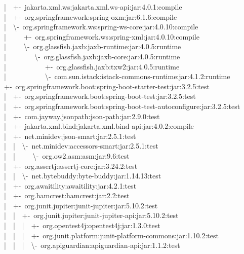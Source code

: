 \documentclass[
    paper=a4,
    twoside=false,
    parskip=half,
    listof=entryprefix,
    listof=totoc,
    index=totoc,
    bibliography=totoc,
    headsepline,
]{scrbook}
\begin{document}
    |~~+-~jakarta.xml.ws:jakarta.xml.ws-api:jar:4.0.1:compile\\
    |~~+-~org.springframework:spring-oxm:jar:6.1.6:compile\\
    |~~\textbackslash-~org.springframework.ws:spring-ws-core:jar:4.0.10:compile\\
    |~~~~~+-~org.springframework.ws:spring-xml:jar:4.0.10:compile\\
    |~~~~~\textbackslash-~org.glassfish.jaxb:jaxb-runtime:jar:4.0.5:runtime\\
    |~~~~~~~~\textbackslash-~org.glassfish.jaxb:jaxb-core:jar:4.0.5:runtime\\
    |~~~~~~~~~~~+-~org.glassfish.jaxb:txw2:jar:4.0.5:runtime\\
    |~~~~~~~~~~~\textbackslash-~com.sun.istack:istack-commons-runtime:jar:4.1.2:runtime\\
    +-~org.springframework.boot:spring-boot-starter-test:jar:3.2.5:test\\
    |~~+-~org.springframework.boot:spring-boot-test:jar:3.2.5:test\\
    |~~+-~org.springframework.boot:spring-boot-test-autoconfigure:jar:3.2.5:test\\
    |~~+-~com.jayway.jsonpath:json-path:jar:2.9.0:test\\
    |~~+-~jakarta.xml.bind:jakarta.xml.bind-api:jar:4.0.2:compile\\
    |~~+-~net.minidev:json-smart:jar:2.5.1:test\\
    |~~|~~\textbackslash-~net.minidev:accessors-smart:jar:2.5.1:test\\
    |~~|~~~~~\textbackslash-~org.ow2.asm:asm:jar:9.6:test\\
    |~~+-~org.assertj:assertj-core:jar:3.24.2:test\\
    |~~|~~\textbackslash-~net.bytebuddy:byte-buddy:jar:1.14.13:test\\
    |~~+-~org.awaitility:awaitility:jar:4.2.1:test\\
    |~~+-~org.hamcrest:hamcrest:jar:2.2:test\\
    |~~+-~org.junit.jupiter:junit-jupiter:jar:5.10.2:test\\
    |~~|~~+-~org.junit.jupiter:junit-jupiter-api:jar:5.10.2:test\\
    |~~|~~|~~+-~org.opentest4j:opentest4j:jar:1.3.0:test\\
    |~~|~~|~~+-~org.junit.platform:junit-platform-commons:jar:1.10.2:test\\
    |~~|~~|~~\textbackslash-~org.apiguardian:apiguardian-api:jar:1.1.2:test\\
\end{document}
